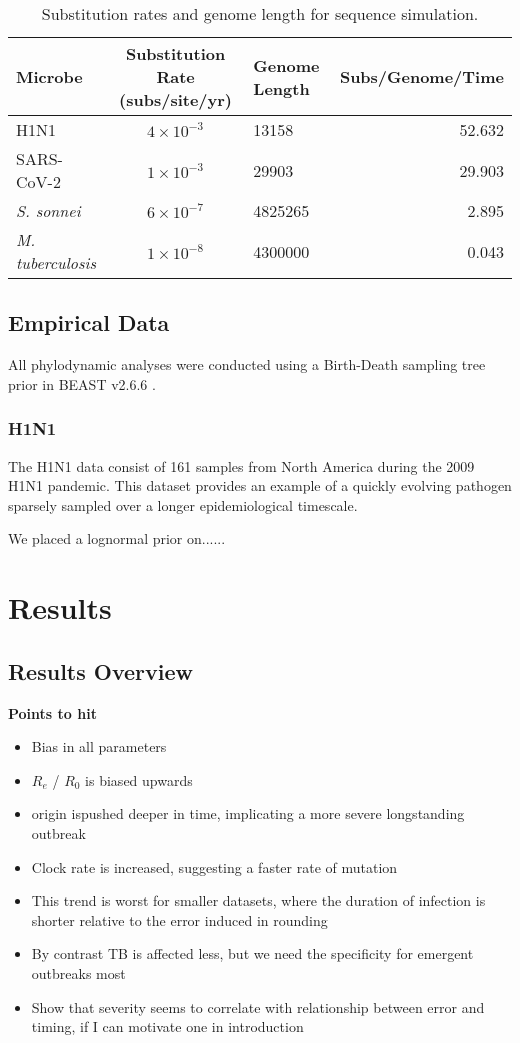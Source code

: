 \documentclass{article}
\begin{document}
\begin{spacing}{1.5}
\begin{table}[ht]
    \centering
    \caption{Substitution rates and genome length for sequence simulation.}
    \begin{tabular}{l|c|l|r}
    \hline
    Microbe                     &   Substitution Rate (subs/site/yr) & Genome Length & Subs/Genome/Time  \\
    \hline
    H1N1                        & $4\times10^{-3}$ & 13158 & 52.632\\
    SARS-CoV-2                  & $1\times10^{-3}$ & 29903 & 29.903\\
    \textit{S. sonnei}    & $6\times10^{-7}$ & 4825265  & 2.895\\
    \textit{M. tuberculosis}    &   $1\times10^{-8}$ & 4300000 & 0.043\\
    \hline
    \end{tabular}
    \label{tab:seq_parms}
\end{table}

\subsection*{Empirical Data}
All phylodynamic analyses were conducted using a Birth-Death sampling tree prior in BEAST v2.6.6 \citep{bouckaert_beast_2019}. 

\subsubsection*{H1N1}
The H1N1 data consist of 161 samples from North America during the 2009 H1N1 pandemic. This  dataset provides an example of a quickly evolving pathogen sparsely sampled over a longer epidemiological timescale. 

We placed a lognormal prior on......

\section*{Results}
\subsection*{Results Overview}
\textbf{Points to hit}
\begin{itemize}
    \item Bias in all parameters
    \item $R_e$ / $R_0$ is biased upwards
    \item origin ispushed deeper in time, implicating a more severe longstanding outbreak
    \item Clock rate is increased, suggesting a faster rate of mutation
    \item This trend is worst for smaller datasets, where the duration of infection is shorter relative to the error induced in rounding
    \item By contrast TB is affected less, but we need the specificity for emergent outbreaks most
    \item Show that severity seems to correlate with relationship between error and timing, if I can motivate one in introduction
\end{itemize}


\end{spacing}
\end{document}
